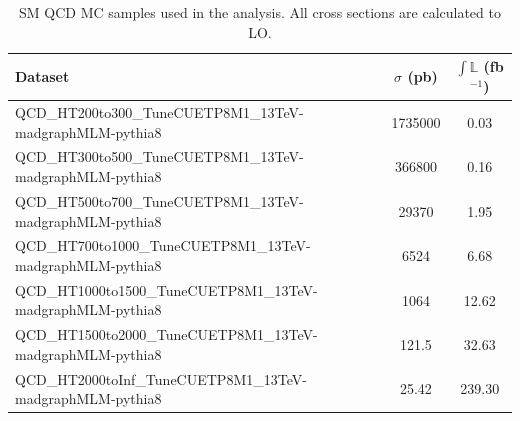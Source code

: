 \begin{table}[hp!]
\centering
\caption{SM QCD MC samples used in the analysis. All cross sections are calculated to LO.}
\label{tab:qcdMCsamples}
{\footnotesize
\begin{tabular}{lcc}
\hline \hline
Dataset & $\sigma$ (pb) & $\int\mathbb{L}$ (fb$^{-1}$) \\
\hline
QCD\_HT200to300\_TuneCUETP8M1\_13TeV-madgraphMLM-pythia8 & 1735000 & 0.03\\
QCD\_HT300to500\_TuneCUETP8M1\_13TeV-madgraphMLM-pythia8 & 366800 & 0.16\\
QCD\_HT500to700\_TuneCUETP8M1\_13TeV-madgraphMLM-pythia8 & 29370 & 1.95\\
QCD\_HT700to1000\_TuneCUETP8M1\_13TeV-madgraphMLM-pythia8 & 6524 & 6.68\\
QCD\_HT1000to1500\_TuneCUETP8M1\_13TeV-madgraphMLM-pythia8 & 1064 & 12.62\\
QCD\_HT1500to2000\_TuneCUETP8M1\_13TeV-madgraphMLM-pythia8 & 121.5 & 32.63\\
QCD\_HT2000toInf\_TuneCUETP8M1\_13TeV-madgraphMLM-pythia8 & 25.42 & 239.30\\
\hline \hline
\end{tabular}
}
\end{table}

